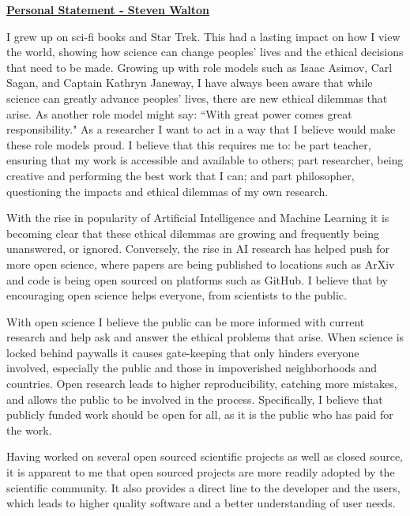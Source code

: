 \documentclass[12pt]{article}
\begin{document}
\begin{center}
\underline{\bf Personal Statement - Steven Walton}\\
\end{center}

I grew up on sci-fi books and Star Trek. This had a lasting impact on how I view
the world, showing how science can change peoples' lives and the ethical
decisions that need to be made. Growing up with role models such as Isaac
Asimov, Carl Sagan, and Captain Kathryn Janeway, I have always been aware that
while science can greatly advance peoples' lives, there are new ethical dilemmas
that arise. As another role model might say: ``With great power comes great
responsibility." As a researcher I want to act in a way that I believe would
make these role models proud. I believe that this requires me to: be part
teacher, ensuring that my work is accessible and available to others; part
researcher, being creative and performing the best work that I can; and part
philosopher, questioning the impacts and ethical dilemmas of my own research.

With the rise in popularity of Artificial Intelligence and Machine Learning it
is becoming clear that these ethical dilemmas are growing and frequently being
unanswered, or ignored. Conversely, the rise in AI research has helped push for
more open science, where papers are being published to locations such as ArXiv
and code is being open sourced on platforms such as GitHub. I believe that by
encouraging open science helps everyone, from scientists to the public. 

With open science I believe the public can be more informed with current
research and help ask and answer the ethical problems that arise. When 
science is locked behind paywalls it causes gate-keeping that only hinders
everyone involved, especially the public and those in impoverished neighborhoods
and countries. Open research leads to higher reproducibility, catching more
mistakes, and allows the public to be involved in the process. Specifically, I
believe that publicly funded work should be open for all, as it is the public
who has paid for the work. 

Having worked on several open sourced scientific projects as well as closed
source, it is apparent to me that open sourced projects are more readily adopted
by the scientific community. It also provides a direct line to the developer and
the users, which leads to higher quality software and a better understanding of
user needs. 
\end{document}
